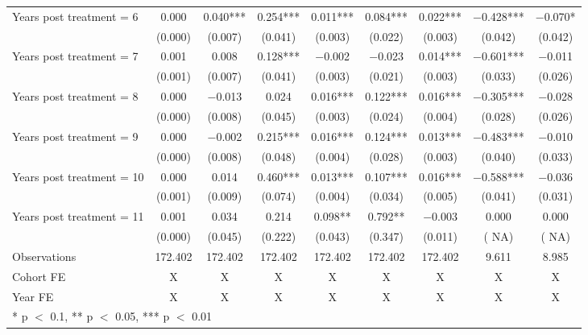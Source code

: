 \begin{table}[H]
{\begin{threeparttable}
\begin{tabular}[t]{lcccccccc}
Years post treatment = 6 & \num{0.000} & \num{ 0.040}*** & \num{ 0.254}*** & \num{ 0.011}*** & \num{ 0.084}*** & \num{ 0.022}*** & \num{-0.428}*** & \num{-0.070}*\\
 & (\num{0.000}) & (\num{0.007}) & (\num{0.041}) & (\num{0.003}) & (\num{0.022}) & (\num{0.003}) & (\num{0.042}) & (\num{0.042})\\
Years post treatment = 7 & \num{0.001} & \num{ 0.008} & \num{ 0.128}*** & \num{-0.002} & \num{-0.023} & \num{ 0.014}*** & \num{-0.601}*** & \num{-0.011}\\
 & (\num{0.001}) & (\num{0.007}) & (\num{0.041}) & (\num{0.003}) & (\num{0.021}) & (\num{0.003}) & (\num{0.033}) & (\num{0.026})\\
Years post treatment = 8 & \num{0.000} & \num{-0.013} & \num{ 0.024} & \num{ 0.016}*** & \num{ 0.122}*** & \num{ 0.016}*** & \num{-0.305}*** & \num{-0.028}\\
 & (\num{0.000}) & (\num{0.008}) & (\num{0.045}) & (\num{0.003}) & (\num{0.024}) & (\num{0.004}) & (\num{0.028}) & (\num{0.026})\\
Years post treatment = 9 & \num{0.000} & \num{-0.002} & \num{ 0.215}*** & \num{ 0.016}*** & \num{ 0.124}*** & \num{ 0.013}*** & \num{-0.483}*** & \num{-0.010}\\
 & (\num{0.000}) & (\num{0.008}) & (\num{0.048}) & (\num{0.004}) & (\num{0.028}) & (\num{0.003}) & (\num{0.040}) & (\num{0.033})\\
Years post treatment = 10 & \num{0.000} & \num{ 0.014} & \num{ 0.460}*** & \num{ 0.013}*** & \num{ 0.107}*** & \num{ 0.016}*** & \num{-0.588}*** & \num{-0.036}\\
 & (\num{0.001}) & (\num{0.009}) & (\num{0.074}) & (\num{0.004}) & (\num{0.034}) & (\num{0.005}) & (\num{0.041}) & (\num{0.031})\\
Years post treatment = 11 & \num{0.001} & \num{ 0.034} & \num{ 0.214} & \num{ 0.098}** & \num{ 0.792}** & \num{-0.003} & \num{ 0.000} & \num{ 0.000}\\
 & (\num{0.000}) & (\num{0.045}) & (\num{0.222}) & (\num{0.043}) & (\num{0.347}) & (\num{0.011}) & (\num{   NA}) & (\num{   NA})\\
\midrule
Observations & \num{172,402} & \num{172,402} & \num{172,402} & \num{172,402} & \num{172,402} & \num{172,402} & \num{9,611} & \num{8,985}\\
Cohort FE & X & X & X & X & X & X & X & X\\
Year FE & X & X & X & X & X & X & X & X\\
\bottomrule
\multicolumn{9}{l}{\rule{0pt}{1em}* p $<$ 0.1, ** p $<$ 0.05, *** p $<$ 0.01}\\

\end{tabular}
\end{threeparttable}}
\end{table}

